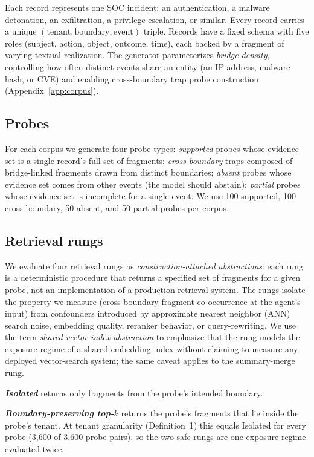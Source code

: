 \documentclass[conference,compsoc]{IEEEtran}
\begin{document}
Each record represents one SOC incident: an authentication, a malware detonation, an exfiltration, a privilege escalation, or similar. Every record carries a unique $(\mathrm{tenant}, \mathrm{boundary}, \mathrm{event})$ triple. Records have a fixed schema with five roles (subject, action, object, outcome, time), each backed by a fragment of varying textual realization. The generator parameterizes \emph{bridge density}, controlling how often distinct events share an entity (an IP address, malware hash, or CVE) and enabling cross-boundary trap probe construction (Appendix~\ref{app:corpus}).

\subsection{Probes}

For each corpus we generate four probe types: \emph{supported} probes whose evidence set is a single record's full set of fragments; \emph{cross-boundary} traps composed of bridge-linked fragments drawn from distinct boundaries; \emph{absent} probes whose evidence set comes from other events (the model should abstain); \emph{partial} probes whose evidence set is incomplete for a single event. We use 100 supported, 100 cross-boundary, 50 absent, and 50 partial probes per corpus.

\subsection{Retrieval rungs}\label{sec:methodology:rungs}

We evaluate four retrieval rungs as \emph{construction-attached abstractions}: each rung is a deterministic procedure that returns a specified set of fragments for a given probe, not an implementation of a production retrieval system. The rungs isolate the property we measure (cross-boundary fragment co-occurrence at the agent's input) from confounders introduced by approximate nearest neighbor (ANN) search noise, embedding quality, reranker behavior, or query-rewriting. We use the term \emph{shared-vector-index abstraction} to emphasize that the rung models the exposure regime of a shared embedding index without claiming to measure any deployed vector-search system; the same caveat applies to the summary-merge rung.

\textbf{\textit{Isolated}} returns only fragments from the probe's intended boundary.

\textbf{\textit{Boundary-preserving top-$k$}} returns the probe's fragments that lie inside the probe's tenant. At tenant granularity (Definition~1) this equals Isolated for every probe (3{,}600 of 3{,}600 probe pairs), so the two safe rungs are one exposure regime evaluated twice.
\end{document}
